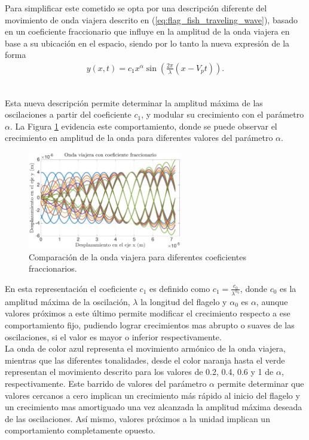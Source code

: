Para simplificar este cometido se opta por una descripción diferente del movimiento de onda viajera descrito en (\ref{eq:flag_fish_traveling_wave}), basado en un coeficiente fraccionario que influye en la amplitud de la onda viajera en base a su ubicación en el espacio, siendo por lo tanto la nueva expresión de la forma
\begin{eqnarray}
	\label{eq:flag_fish_traveling_wave_fractional}
	y (x,t) = c_1 x^{\alpha} \sin \left( \frac{2 \pi}{\lambda}  ( x - V_p t) \right).
\end{eqnarray}
\

Esta nueva descripción permite determinar la amplitud máxima de las oscilaciones a partir del coeficiente $c_1$, y modular su crecimiento con el parámetro $\alpha$. La Figura \ref{fig:OVF} evidencia este comportamiento, donde se puede observar el crecimiento en amplitud de la onda para diferentes valores del parámetro $\alpha$.
\begin{figure}[!h] %
	\vspace*{3mm}
    \centering
    \includegraphics[width=0.6\textwidth]{Figuras/OVF}
  	\caption{Comparación de la onda viajera para diferentes coeficientes fraccionarios.}
  	\label{fig:OVF}
\end{figure}
 En esta representación el coeficiente $c_1$ es definido como $c_1 = \frac{c_0}{\lambda^{\alpha_0}}$, donde $c_0$ es la amplitud máxima de la oscilación, $\lambda$ la longitud del flagelo y $\alpha_0$ es $\alpha$, aunque valores próximos a este último permite modificar el crecimiento respecto a ese comportamiento fijo, pudiendo lograr crecimientos mas abrupto o suaves de las oscilaciones, si el valor es mayor o inferior respectivamente.\\
 
La onda de color azul representa el movimiento armónico de la onda viajera, mientras que las diferentes tonalidades, desde el color naranja hasta el verde representan el movimiento descrito para los valores de 0.2, 0.4, 0.6 y 1 de $\alpha$, respectivamente. Este barrido de valores del parámetro $\alpha$ permite determinar que valores cercanos a cero implican un crecimiento más rápido al inicio del flagelo y un crecimiento mas amortiguado una vez alcanzada la amplitud máxima deseada de las oscilaciones. Así mismo, valores próximos a la unidad implican un comportamiento completamente opuesto.\\

